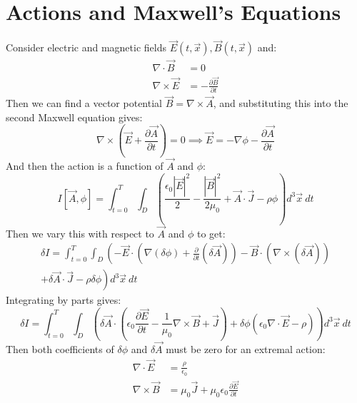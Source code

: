 \documentclass[../Main.tex]{subfiles}
\begin{document}
\section{Actions and Maxwell's Equations}
Consider electric and magnetic fields $\vec{E}(t, \vec{x}), \vec{B}(t, \vec{x})$ and:
\begin{align}
    \nabla \cdot \vec{B} &= 0 \label{eqnMaxwellI} \\
    \nabla \times \vec{E} &= -\frac{\partial \vec{B}}{\partial t} \label{eqnMaxwellII}
\end{align}
Then we can find a vector potential $\vec{B} = \nabla \times \vec{A}$, and substituting this into the second Maxwell equation gives:
\begin{equation*}
    \nabla \times (\vec{E} + \frac{\partial \vec{A}}{\partial t}) = 0 \implies \vec{E} = -\nabla \phi - \frac{\partial \vec{A}}{\partial t}
\end{equation*}
And then the action is a function of $\vec{A}$ and $\phi$:
\begin{equation*}
    I[\vec{A}, \phi] = \int_{t = 0}^T\int_D \left(\frac{\epsilon_0 |\vec{E}|^2}{2} - \frac{|\vec{B}|^2}{2\mu_0} + \vec{A} \cdot \vec{J} - \rho \phi\right) d^3\vec{x}~dt
\end{equation*}
Then we vary this with respect to $\vec{A}$ and $\phi$ to get:
\begin{equation*}
    \begin{split}
        \delta I = \int_{t = 0}^T\int_D \left(-\vec{E} \cdot \left(\nabla (\delta \phi) + \frac{\partial}{\partial t} (\delta \vec{A})\right) - \vec{B} \cdot \left(\nabla \times (\delta \vec{A})\right)\right.\\
        \left. + \delta\vec{A} \cdot \vec{J} - \rho \delta\phi\right)d^3\vec{x}~dt
    \end{split}
\end{equation*}
Integrating by parts gives:
\begin{equation*}
    \delta I = \int_{t = 0}^T\int_D \left(\delta \vec{A} \cdot \left(\epsilon_0\frac{\partial \vec{E}}{\partial t} - \frac{1}{\mu_0}\nabla \times \vec{B} + \vec{J}\right) + \delta \phi \left(\epsilon_0\nabla \cdot \vec{E} - \rho\right)\right) d^3\vec{x}~dt
\end{equation*}
Then both coefficients of $\delta \phi$ and $\delta \vec{A}$ must be zero for an extremal action:
\begin{align}
    \nabla \cdot \vec{E} &= \frac{\rho}{\epsilon_0} \label{eqnMaxwellIII} \\
    \nabla \times \vec{B} &= \mu_0 \vec{J} + \mu_0\epsilon_0 \frac{\partial \vec{E}}{\partial t} \label{eqnMaxwellIV}
\end{align}
\end{document}
